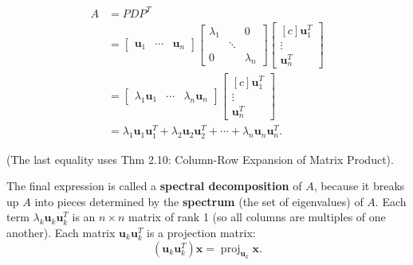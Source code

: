 \documentclass[10pt]{book}
\newenvironment{boxdef}{\begin{mdframed}[backgroundcolor=gray!30,linewidth=0pt,nobreak=true]}{\end{mdframed}}
\newcommand{\vect}[1]{\ensuremath{\boldsymbol{\mathbf{#1}}}}
\DeclareMathOperator{\Span}{Span}
\DeclareMathOperator{\proj}{proj}
\begin{document}
\begin{itemize}
\begin{boxdef}
	\vspace{-2em}
	\begin{multicols}{2}
		\begin{align*}
		A &= PDP^T \\
		&= \begin{bmatrix}\vect{u}_1&\cdots&\vect{u}_n\end{bmatrix}
		\begin{bmatrix}\lambda_1&&0\\&\ddots&\\0&&\lambda_n\end{bmatrix}
		\begin{bmatrix}[c]\vect{u}_1^T\\ \vdots\\ \vect{u}_n^T\end{bmatrix}\\
		&= \begin{bmatrix}\lambda_1\vect{u}_1&\cdots&\lambda_n\vect{u}_n\end{bmatrix}
		\begin{bmatrix}[c]\vect{u}_1^T\\ \vdots\\ \vect{u}_n^T\end{bmatrix} \\
		&= \lambda_1\vect{u}_1\vect{u}_1^T + \lambda_2\vect{u}_2\vect{u}_2^T + \cdots + \lambda_n\vect{u}_n\vect{u}_n^T.
		\end{align*}
		
		\columnbreak
		
		(The last equality uses Thm 2.10: Column-Row Expansion of Matrix Product).
		
		The final expression is called a \textbf{spectral decomposition} of $A$, because it breaks up $A$ into pieces determined by the \textbf{spectrum} (the set of eigenvalues) of $A$. Each term $\lambda_k\vect{u}_k\vect{u}_k^T$ is an $n\times n$ matrix of rank 1 (so all columns are multiples of one another). Each matrix $\vect{u}_k\vect{u}_k^T$ is a projection matrix:
		$$ (\vect{u}_k\vect{u}_k^T)\vect{x} = \proj_{\vect{u}_k}\vect{x}. $$
	\end{multicols}
	\end{boxdef}
\end{itemize}
\end{document}
